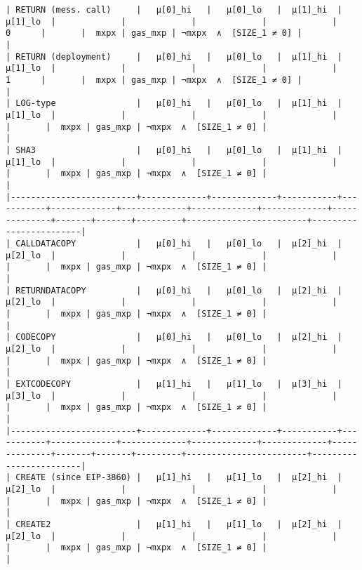 \documentclass[varwidth=\maxdimen,margin=0.5cm,multi={verbatim}]{standalone}
\begin{document}
\begin{verbatim}
| RETURN (mess. call)     |   μ[0]_hi   |   μ[0]_lo   |  μ[1]_hi  |  μ[1]_lo  |             |             |             |             |       0      |       |  mxpx | gas_mxp | ¬mxpx  ∧  [SIZE_1 ≠ 0] |                        |
| RETURN (deployment)     |   μ[0]_hi   |   μ[0]_lo   |  μ[1]_hi  |  μ[1]_lo  |             |             |             |             |       1      |       |  mxpx | gas_mxp | ¬mxpx  ∧  [SIZE_1 ≠ 0] |                        |
| LOG-type                |   μ[0]_hi   |   μ[0]_lo   |  μ[1]_hi  |  μ[1]_lo  |             |             |             |             |              |       |  mxpx | gas_mxp | ¬mxpx  ∧  [SIZE_1 ≠ 0] |                        |
| SHA3                    |   μ[0]_hi   |   μ[0]_lo   |  μ[1]_hi  |  μ[1]_lo  |             |             |             |             |              |       |  mxpx | gas_mxp | ¬mxpx  ∧  [SIZE_1 ≠ 0] |                        |
|-------------------------+-------------+-------------+-----------+-----------+-------------+-------------+-------------+-------------+--------------+-------+-------+---------+------------------------+------------------------|
| CALLDATACOPY            |   μ[0]_hi   |   μ[0]_lo   |  μ[2]_hi  |  μ[2]_lo  |             |             |             |             |              |       |  mxpx | gas_mxp | ¬mxpx  ∧  [SIZE_1 ≠ 0] |                        |
| RETURNDATACOPY          |   μ[0]_hi   |   μ[0]_lo   |  μ[2]_hi  |  μ[2]_lo  |             |             |             |             |              |       |  mxpx | gas_mxp | ¬mxpx  ∧  [SIZE_1 ≠ 0] |                        |
| CODECOPY                |   μ[0]_hi   |   μ[0]_lo   |  μ[2]_hi  |  μ[2]_lo  |             |             |             |             |              |       |  mxpx | gas_mxp | ¬mxpx  ∧  [SIZE_1 ≠ 0] |                        |
| EXTCODECOPY             |   μ[1]_hi   |   μ[1]_lo   |  μ[3]_hi  |  μ[3]_lo  |             |             |             |             |              |       |  mxpx | gas_mxp | ¬mxpx  ∧  [SIZE_1 ≠ 0] |                        |
|-------------------------+-------------+-------------+-----------+-----------+-------------+-------------+-------------+-------------+--------------+-------+-------+---------+------------------------+------------------------|
| CREATE (since EIP-3860) |   μ[1]_hi   |   μ[1]_lo   |  μ[2]_hi  |  μ[2]_lo  |             |             |             |             |              |       |  mxpx | gas_mxp | ¬mxpx  ∧  [SIZE_1 ≠ 0] |                        |
| CREATE2                 |   μ[1]_hi   |   μ[1]_lo   |  μ[2]_hi  |  μ[2]_lo  |             |             |             |             |              |       |  mxpx | gas_mxp | ¬mxpx  ∧  [SIZE_1 ≠ 0] |                        |

\end{verbatim}
\end{document}
